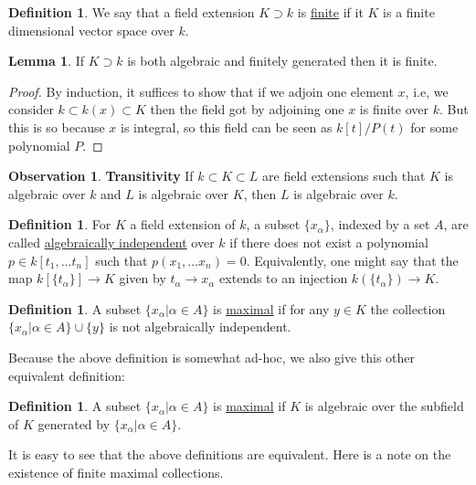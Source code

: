 \documentclass[12 pt]{article}
\theoremstyle{definition}
\newtheorem{lemma}[thm]{Lemma}
\newtheorem{defn}[thm]{Definition}
\newtheorem{obs}[thm]{Observation}
\renewcommand{\(}{\left(}
\renewcommand{\)}{\right)}
\begin{document}
\begin{defn} We say that a field extension $K \supset k$ is \underline{finite} if it $K$ is a finite dimensional vector space over $k$.
\end{defn}

\begin{lemma} If $K \supset k$ is both algebraic and finitely generated then it is finite.
\end{lemma}
\begin{proof} By induction, it suffices to show that if we adjoin one element $x$, i.e, we consider $k \subset k(x) \subset K$ then the field got by adjoining one $x$ is finite over $k$. But this is so because $x$ is integral, so this field can be seen as $k[t]/P(t)$ for some polynomial $P$.
\end{proof}

\begin{obs} \textbf{Transitivity} If $k \subset K \subset L$ are field extensions such that $K$ is algebraic over $k$ and $L$ is algebraic over $K$, then $L$ is algebraic over $k$.
\end{obs}

\begin{defn} For $K$ a field extension of $k$, a subset $\{x_\alpha\}$, indexed by a set $A$, are called \underline{algebraically independent} over $k$ if there does not exist a polynomial $p \in k[t_1, \ldots t_n]$ such that $p(x_1, \ldots x_n)=0$. Equivalently, one might say that the map $k[\{t_\alpha\}] \to K$ given by $t_\alpha \to x_\alpha$ extends to an injection $k(\{t_\alpha\}) \to K$.
\end{defn}

\phantom{\textcolor[rgb]{0.98,0.00,0.00}{Question: does the above $A$ need to be finite?}}

\begin{defn} A subset $\{x_\alpha| \alpha \in A\}$ is \underline{maximal} if for any $y \in K$ the collection $\{x_\alpha|\alpha \in A\} \cup \{y\}$ is not algebraically independent.
\end{defn}

Because the above definition is somewhat ad-hoc, we also give this other equivalent definition:

\begin{defn} A subset $\{x_\alpha| \alpha \in A\}$ is \underline{maximal} if $K$ is algebraic over the subfield of $K$ generated by $\{x_\alpha| \alpha \in A\}$.
\end{defn}

It is easy to see that the above definitions are equivalent. Here is a note on the existence of finite maximal collections.
\end{document}
